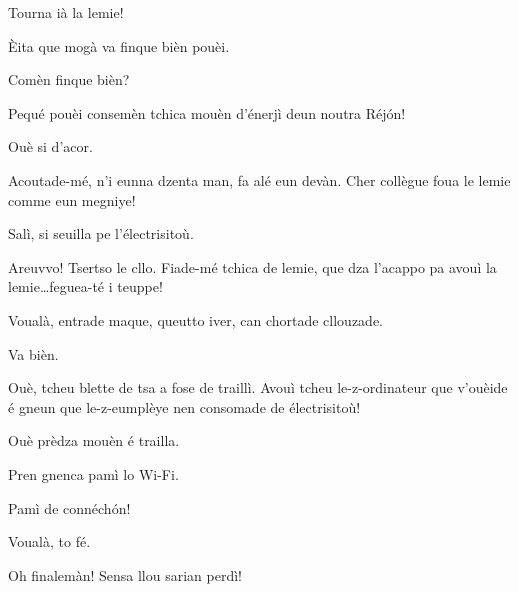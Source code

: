 \begin{drama}




\Tuenospeaks Tourna ià la lemie!

\Richardspeaks \`Eita que mogà va finque bièn pouèi.

\Tuenospeaks Comèn finque bièn?

\Richardspeaks Pequé pouèi consemèn tchica mouèn d'énerjì deun noutra Réj\'on!

\Gerominespeaks Ouè si d'acor.

\Richardspeaks Acoutade-mé, n'i eunna dzenta man, fa alé eun devàn. Cher collègue \og foua le lemie comme eun megniye\fg ! 


\Elettricistaspeaks{} Salì, si seuilla pe l'électrisitoù.

\Sandrinospeaks Areuvvo! Tsertso le cllo. Fiade-mé tchica de lemie, que dza l'acappo pa avouì la lemie\ldots feguea-té i teuppe!


\Sandrinospeaks Voualà, entrade maque, queutto iver, can chortade cllouzade.

\Elettricistaspeaks Va bièn.


\Elettricistaspeaks{} Ouè, tcheu blette de tsa a fose de traillì. Avouì tcheu le-z-ordinateur que v'ouèide é gneun que le-z-eumplèye nen consomade de électrisitoù! 

\Saventaspeaks{} Ouè prèdza mouèn é trailla.

\Gerominespeaks Pren gnenca pamì lo Wi-Fi.

\Saventaspeaks Pamì de connéch\'on!


\Elettricistaspeaks Voualà, to fé.

\Richardspeaks{} Oh finalemàn! Sensa llou sarian perdì!


\end{drama}
